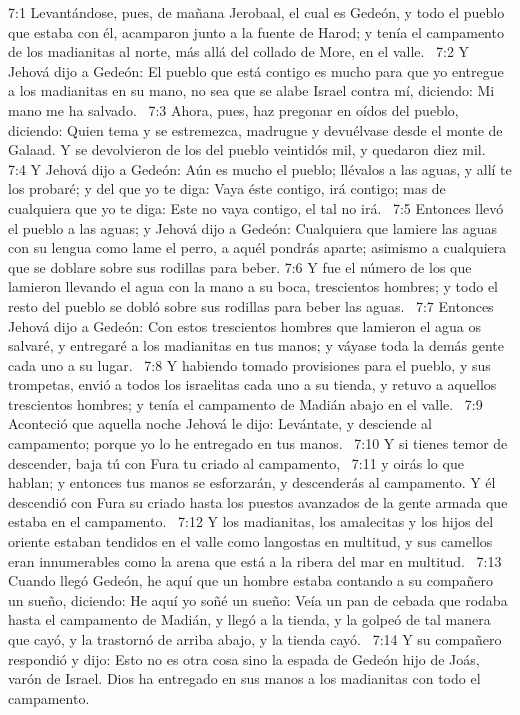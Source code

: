 7:1 Levantándose, pues, de mañana Jerobaal, el cual es Gedeón, y todo el pueblo que estaba con él, acamparon junto a la fuente de Harod; y tenía el campamento de los madianitas al norte, más allá del collado de More, en el valle.  
7:2 Y Jehová dijo a Gedeón: El pueblo que está contigo es mucho para que yo entregue a los madianitas en su mano, no sea que se alabe Israel contra mí, diciendo: Mi mano me ha salvado.  
7:3 Ahora, pues, haz pregonar en oídos del pueblo, diciendo: Quien tema y se estremezca, madrugue y devuélvase desde el monte de Galaad. Y se devolvieron de los del pueblo veintidós mil, y quedaron diez mil.  
7:4 Y Jehová dijo a Gedeón: Aún es mucho el pueblo; llévalos a las aguas, y allí te los probaré; y del que yo te diga: Vaya éste contigo, irá contigo; mas de cualquiera que yo te diga: Este no vaya contigo, el tal no irá.  
7:5 Entonces llevó el pueblo a las aguas; y Jehová dijo a Gedeón: Cualquiera que lamiere las aguas con su lengua como lame el perro, a aquél pondrás aparte; asimismo a cualquiera que se doblare sobre sus rodillas para beber. 
7:6 Y fue el número de los que lamieron llevando el agua con la mano a su boca, trescientos hombres; y todo el resto del pueblo se dobló sobre sus rodillas para beber las aguas.  
7:7 Entonces Jehová dijo a Gedeón: Con estos trescientos hombres que lamieron el agua os salvaré, y entregaré a los madianitas en tus manos; y váyase toda la demás gente cada uno a su lugar.  
7:8 Y habiendo tomado provisiones para el pueblo, y sus trompetas, envió a todos los israelitas cada uno a su tienda, y retuvo a aquellos trescientos hombres; y tenía el campamento de Madián abajo en el valle.  
7:9 Aconteció que aquella noche Jehová le dijo: Levántate, y desciende al campamento; porque yo lo he entregado en tus manos.  
7:10 Y si tienes temor de descender, baja tú con Fura tu criado al campamento,  
7:11 y oirás lo que hablan; y entonces tus manos se esforzarán, y descenderás al campamento. Y él descendió con Fura su criado hasta los puestos avanzados de la gente armada que estaba en el campamento.  
7:12 Y los madianitas, los amalecitas y los hijos del oriente estaban tendidos en el valle como langostas en multitud, y sus camellos eran innumerables como la arena que está a la ribera del mar en multitud.  
7:13 Cuando llegó Gedeón, he aquí que un hombre estaba contando a su compañero un sueño, diciendo: He aquí yo soñé un sueño: Veía un pan de cebada que rodaba hasta el campamento de Madián, y llegó a la tienda, y la golpeó de tal manera que cayó, y la trastornó de arriba abajo, y la tienda cayó.  
7:14 Y su compañero respondió y dijo: Esto no es otra cosa sino la espada de Gedeón hijo de Joás, varón de Israel. Dios ha entregado en sus manos a los madianitas con todo el campamento.  
